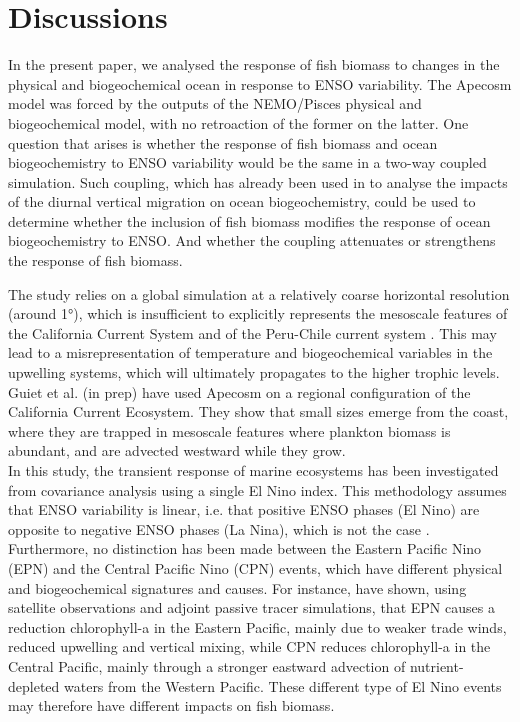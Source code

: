 \section{Discussions}

In the present paper, we analysed the response of fish biomass to changes in the physical and biogeochemical ocean in response to ENSO variability. The Apecosm model was forced by the outputs of the NEMO/Pisces physical and biogeochemical model, with no retroaction of the former on the latter. One question that arises is whether the response of fish biomass and ocean biogeochemistry to ENSO variability would be the same in a two-way coupled simulation. 	Such coupling, which has already been used in \cite{aumontEvaluatingPotentialImpacts2018} to analyse the impacts of the diurnal vertical migration on ocean biogeochemistry, could be used to determine whether the inclusion of fish biomass modifies the response of ocean biogeochemistry to ENSO. And whether the coupling attenuates or strengthens the response of fish biomass. 
 
The study relies on a global simulation at a relatively coarse horizontal resolution (around 1°), which is insufficient to explicitly represents the mesoscale features of the California Current System \citep{capetMesoscaleSubmesoscaleTransition2008} and of the Peru-Chile current system \citep{colasHeatBalanceEddies2012}. This may lead to a misrepresentation of temperature and biogeochemical variables in the upwelling systems, which will ultimately propagates to the higher trophic levels. Guiet et al. (in prep) have used Apecosm on a regional configuration of the California Current Ecosystem. They show that small sizes emerge from the coast, where they are trapped in mesoscale features where plankton biomass is abundant, and are advected westward while they grow.\\

In this study, the transient response of marine ecosystems has been investigated from covariance analysis using a single El Nino index. This methodology assumes that ENSO variability is linear, i.e. that positive ENSO phases (El Nino) are opposite to negative ENSO phases (La Nina), which is not the case \citep{larkinENSOWarmNino2002}. Furthermore, no distinction has been made between the Eastern Pacific Nino (EPN) and the Central Pacific Nino (CPN) events, which have different physical and biogeochemical signatures and causes. For instance, \cite{gierachBiologicalResponse19972012} have shown, using satellite observations and adjoint passive tracer simulations, that EPN causes a reduction chlorophyll-a in the Eastern Pacific, mainly due to weaker trade winds, reduced upwelling and vertical mixing, while CPN reduces chlorophyll-a in the Central Pacific, mainly through a stronger eastward advection of nutrient-depleted waters from the Western Pacific. These different type of El Nino events may therefore have different impacts on fish biomass.\\

